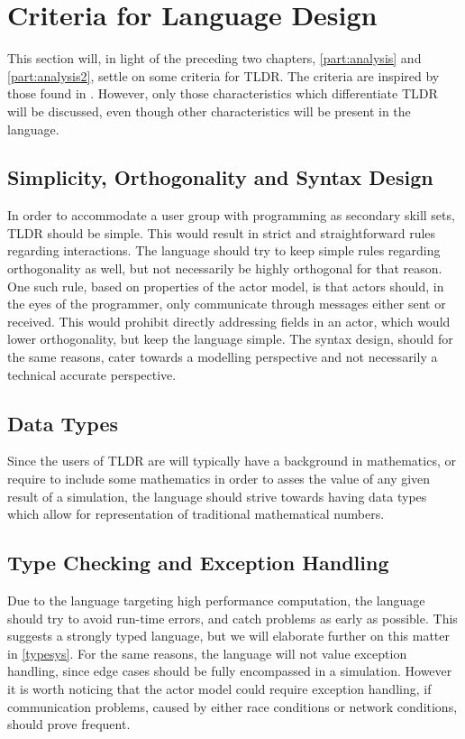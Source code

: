 \section{Criteria for Language Design}\label{analsum}

This section will, in light of the preceding two chapters, \cref{part:analysis} and \cref{part:analysis2}, settle on some criteria for TLDR. The criteria are inspired by those found in \cite{sebesta2015concepts}. However, only those characteristics which differentiate TLDR will be discussed, even though other characteristics will be present in the language.


\subsection{Simplicity, Orthogonality and Syntax Design}

In order to accommodate a user group with programming as secondary skill sets, TLDR should be simple. This would result in strict and straightforward rules regarding interactions. The language should try to keep simple rules regarding orthogonality as well, but not necessarily be highly orthogonal for that reason. One such rule, based on properties of the actor model, is that actors should, in the eyes of the programmer, only communicate through messages either sent or received. This would prohibit directly addressing fields in an actor, which would lower orthogonality, but keep the language simple. The syntax design, should for the same reasons, cater towards a modelling perspective and not necessarily a technical accurate perspective.

\subsection{Data Types}

Since the users of TLDR are will typically have a background in mathematics, or require to include some mathematics in order to asses the value of any given result of a simulation, the language should strive towards having data types which allow for representation of traditional mathematical numbers.


\subsection{Type Checking and Exception Handling}

Due to the language targeting high performance computation, the language should try to avoid run-time errors, and catch problems as early as possible. This suggests a strongly typed language, but we will elaborate further on this matter in \cref{typesys}. For the same reasons, the language will not value exception handling, since edge cases should be fully encompassed in a simulation. However it is worth noticing that the actor model could require exception handling, if communication problems, caused by either race conditions or network conditions, should prove frequent.

